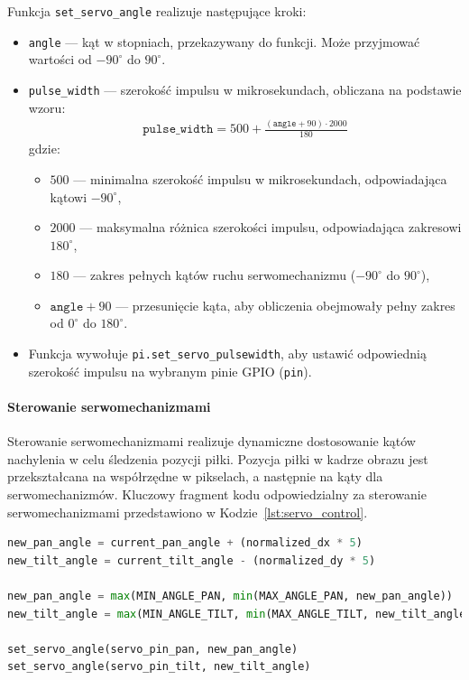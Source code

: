 \documentclass[a4paper,twoside,12pt]{book}
\begin{document}
\newpage
Funkcja \texttt{set\_servo\_angle} realizuje następujące kroki:
\begin{itemize}
    \item \texttt{angle} — kąt w stopniach, przekazywany do funkcji. Może przyjmować wartości od $-90^{\circ}$ do $90^{\circ}$.
    \item \texttt{pulse\_width} — szerokość impulsu w mikrosekundach, obliczana na podstawie wzoru:
    \begin{align}
    \texttt{pulse\_width} = 500 + \frac{(\texttt{angle} + 90) \cdot 2000}{180}
    \end{align}
    gdzie:
    \begin{itemize}
        \item $500$ — minimalna szerokość impulsu w mikrosekundach, odpowiadająca kątowi $-90^{\circ}$,
        \item $2000$ — maksymalna różnica szerokości impulsu, odpowiadająca zakresowi $180^{\circ}$,
        \item $180$ — zakres pełnych kątów ruchu serwomechanizmu ($-90^{\circ}$ do $90^{\circ}$),
        \item $\texttt{angle} + 90$ — przesunięcie kąta, aby obliczenia obejmowały pełny zakres od $0^{\circ}$ do $180^{\circ}$.
    \end{itemize}
    \item Funkcja wywołuje \texttt{pi.set\_servo\_pulsewidth}, aby ustawić odpowiednią szerokość impulsu na wybranym pinie GPIO (\texttt{pin}).
\end{itemize}

\paragraph{Sterowanie serwomechanizmami}
Sterowanie serwomechanizmami realizuje dynamiczne dostosowanie kątów nachylenia w celu śledzenia pozycji piłki. Pozycja piłki w kadrze obrazu jest przekształcana na współrzędne w pikselach, a następnie na kąty dla serwomechanizmów. Kluczowy fragment kodu odpowiedzialny za sterowanie serwomechanizmami przedstawiono w Kodzie~\ref{lst:servo_control}.

\begin{lstlisting}[language=Python, caption={Algorytm sterowania serwomechanizmami.}, label={lst:servo_control}, captionpos=b]
new_pan_angle = current_pan_angle + (normalized_dx * 5)
new_tilt_angle = current_tilt_angle - (normalized_dy * 5)

new_pan_angle = max(MIN_ANGLE_PAN, min(MAX_ANGLE_PAN, new_pan_angle))
new_tilt_angle = max(MIN_ANGLE_TILT, min(MAX_ANGLE_TILT, new_tilt_angle))

set_servo_angle(servo_pin_pan, new_pan_angle)
set_servo_angle(servo_pin_tilt, new_tilt_angle)
\end{lstlisting}
\end{document}

